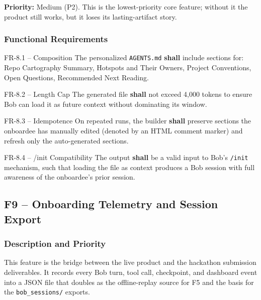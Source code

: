 \documentclass[11pt,letterpaper]{article}
\newcommand{\shall}{\textbf{shall}}
\begin{document}
\textbf{Priority:} Medium (P2). This is the lowest-priority core feature; without it the product still works, but it loses its lasting-artifact story.

\subsubsection{Functional Requirements}

\begin{reqbox}{FR-8.1 -- Composition}
The personalized \texttt{AGENTS.md} \shall{} include sections for: Repo Cartography Summary, Hotspots and Their Owners, Project Conventions, Open Questions, Recommended Next Reading.
\end{reqbox}

\begin{reqbox}{FR-8.2 -- Length Cap}
The generated file \shall{} not exceed 4{,}000 tokens to ensure Bob can load it as future context without dominating its window.
\end{reqbox}

\begin{reqbox}{FR-8.3 -- Idempotence}
On repeated runs, the builder \shall{} preserve sections the onboardee has manually edited (denoted by an HTML comment marker) and refresh only the auto-generated sections.
\end{reqbox}

\begin{reqbox}{FR-8.4 -- /init Compatibility}
The output \shall{} be a valid input to Bob's \texttt{/init} mechanism, such that loading the file as context produces a Bob session with full awareness of the onboardee's prior session.
\end{reqbox}

\subsection{F9 -- Onboarding Telemetry and Session Export}

\subsubsection{Description and Priority}

This feature is the bridge between the live product and the hackathon submission deliverables. It records every Bob turn, tool call, checkpoint, and dashboard event into a JSON file that doubles as the offline-replay source for F5 and the basis for the \texttt{bob\_sessions/} exports.
\end{document}
